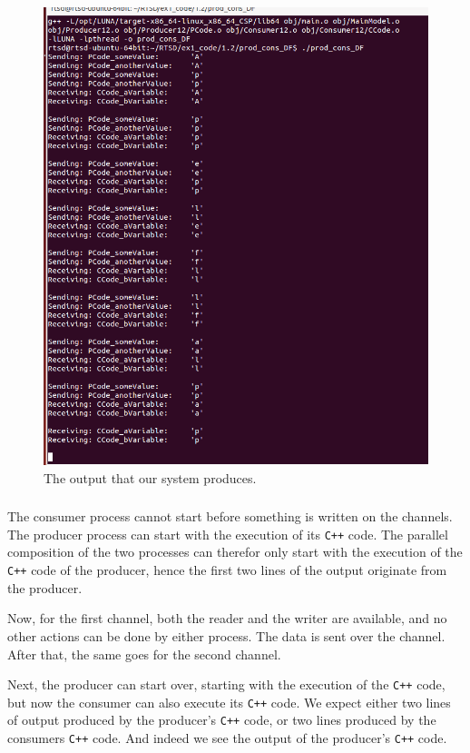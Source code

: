 \documentclass[a4paper,twoside,11pt]{article}
\newcommand{\cpp}{{\tt C++} }
\begin{document}
\begin{figure}
 \centering
 \includegraphics[width=\textwidth]{./images/1_2-SystemDF+_output.png}
 \caption{The output that our system produces.}
 \label{fig:SystemDF+_output}
\end{figure}
\FloatBarrier
\subsubsection{}
The consumer process cannot start before something is written on the channels. The producer process can start with the execution of its \cpp code. The parallel composition of the two processes can therefor only start with the execution of the \cpp code of the producer, hence the first two lines of the output originate from the producer.

Now, for the first channel, both the reader and the writer are available, and no other actions can be done by either process. The data is sent over the channel. After that, the same goes for the second channel.

Next, the producer can start over, starting with the execution of the \cpp code, but now the consumer can also execute its \cpp code. We expect either two lines of output produced by the producer's \cpp code, or two lines produced by the consumers \cpp code. And indeed we see the output of the producer's \cpp code.
\end{document}
